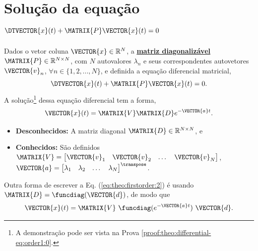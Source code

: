 \section{ Solução da equação $\DTVECTOR{x}(t) + \MATRIX{P} \VECTOR{x}(t)=0$ }

\begin{theorem}[Equação 
$\DTVECTOR{x}(t) + \MATRIX{P} \VECTOR{x}(t)=0$ com matriz $\MATRIX{P}$ diagonalizável:]
\label{theo:differential-eq:order1:0}
Dados o vetor coluna $\VECTOR{x} \in \mathbb{R}^N$, 
a \hyperref[def:diagonalization0]{\textbf{matriz diagonalizável}} $\MATRIX{P} \in \mathbb{R}^{N\times N}$,
com $N$ autovalores $\lambda_n$ e seus correspondentes autovetores $\VECTOR{v}_n$,
$\forall n \in \{1, 2, ..., N\}$, 
e definida a equação diferencial matricial,
\begin{equation}
\DTVECTOR{x}(t) + \MATRIX{P} \VECTOR{x}(t)=0.
\end{equation}
A solução\footnote{A
demonstração pode ser vista na Prova \ref{proof:theo:differential-eq:order1:0}.} dessa equação diferencial tem  a forma,
\begin{equation}\label{eq:theo:firstorder:2}
 \VECTOR{x}(t)= \MATRIX{V}\MATRIX{D} e^{-\VECTOR{a}t}.
\end{equation}
\begin{itemize}
\item \textbf{Desconhecidos:} A matriz diagonal $\MATRIX{D} \in \mathbb{R}^{N \times N}$, e
\item  \textbf{Conhecidos:} São definidos $\MATRIX{V}=
\begin{bmatrix}
\VECTOR{v}_1 & \VECTOR{v}_2 & \dots & \VECTOR{v}_N
\end{bmatrix}$, 
$\VECTOR{a}=
\begin{bmatrix}
\lambda_1 & \lambda_2 & \dots & \lambda_N
\end{bmatrix}^{\transpose}$.
\end{itemize}
\end{theorem}

\begin{corollary}
\label{coro:differential-eq:order1:0}
Outra forma de escrever a Eq. (\ref{eq:theo:firstorder:2}) é usando $\MATRIX{D}=\funcdiag(\VECTOR{d})$, de modo que
\begin{equation}\label{eq:coro:firstorder:1}
 \VECTOR{x}(t)= \MATRIX{V}~\funcdiag(e^{-\VECTOR{a}t})~\VECTOR{d}.
\end{equation}
\end{corollary}

